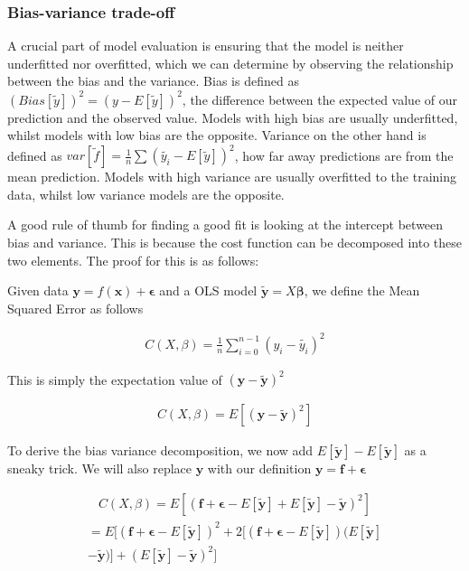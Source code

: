 \documentclass[twocolumn,10pt,cleanfoot]{asme2ej}
\begin{document}
\subsubsection{Bias-variance trade-off}

A crucial part of model evaluation is ensuring that the model is neither underfitted nor overfitted, which we can determine by observing the relationship between the bias and the variance. Bias is defined as $(Bias[\tilde{y}])^2 = (y-E[\tilde{y}])^2$, the difference between the expected value of our prediction and the observed value. Models with high bias are usually underfitted, whilst models with low bias are the opposite. Variance on the other hand is defined as $var[\tilde{f}] = \frac{1}{n}\sum(\tilde{y_i}-E[\tilde{y}])^2$, how far away predictions are from the mean prediction. Models with high variance are usually overfitted to the training data, whilst low variance models are the opposite.

A good rule of thumb for finding a good fit is looking at the intercept between bias and variance. This is because the cost function can be decomposed into these two elements. The proof for this is as follows:

Given data $\bm{y} = f(\bm{x}) + \bm{\epsilon}$ and a OLS model $\bm{\tilde{y}} = X\bm{\beta}$, we define
the Mean Squared Error as follows

\begin{gather}
C(X,\beta) = \frac{1}{n}\sum_{i=0}^{n-1}(y_i - \tilde{y_i})^2
\end{gather}

This is simply the expectation value of $(\bm{y} - \bm{\tilde{y}})^2$

\begin{gather}
C(X,\beta) = E\left[(\bm{y} - \bm{\tilde{y}})^2\right]
\end{gather}

To derive the bias variance decomposition, we now add $E[\bm{\tilde{y}}] - E[\bm{\tilde{y}}]$ 
as a sneaky trick. We will also replace $\bm{y}$ with our definition $\bm{y} = \bm{f} + \bm{\epsilon}$

\begin{gather}
C(X,\beta) = E\left[(\bm{f} + \bm{\epsilon} - E[\bm{\tilde{y}}] + E[\bm{\tilde{y}}] - \bm{\tilde{y}})^2\right]
\end{gather}
\begin{multline}
= E[(\bm{f} + \bm{\epsilon} - E[\bm{\tilde{y}}])^2 + 2[(\bm{f} + \bm{\epsilon} - E[\bm{\tilde{y}}])(E[\bm{\tilde{y}}] \\
	- \bm{\tilde{y}})] +(E[\bm{\tilde{y}}] - \bm{\tilde{y}})^2]
\end{multline}
\end{document}
